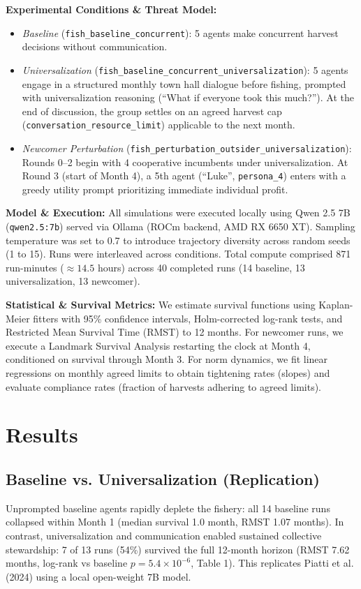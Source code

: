 ﻿\documentclass[11pt,a4paper]{article}
\begin{document}
\textbf{Experimental Conditions \& Threat Model:}
\begin{itemize}[leftmargin=*,itemsep=1pt]
    \item \textit{Baseline} (\texttt{fish\_baseline\_concurrent}): 5 agents make concurrent harvest decisions without communication.
    \item \textit{Universalization} (\texttt{fish\_baseline\_concurrent\_universalization}): 5 agents engage in a structured monthly town hall dialogue before fishing, prompted with universalization reasoning (``What if everyone took this much?''). At the end of discussion, the group settles on an agreed harvest cap (\texttt{conversation\_resource\_limit}) applicable to the next month.
    \item \textit{Newcomer Perturbation} (\texttt{fish\_perturbation\_outsider\_universalization}): Rounds 0--2 begin with 4 cooperative incumbents under universalization. At Round 3 (start of Month 4), a 5th agent (``Luke'', \texttt{persona\_4}) enters with a greedy utility prompt prioritizing immediate individual profit.
\end{itemize}

\textbf{Model \& Execution:} All simulations were executed locally using Qwen 2.5 7B (\texttt{qwen2.5:7b}) served via Ollama (ROCm backend, AMD RX 6650 XT). Sampling temperature was set to 0.7 to introduce trajectory diversity across random seeds (1 to 15). Runs were interleaved across conditions. Total compute comprised 871 run-minutes ($\approx 14.5$ hours) across 40 completed runs (14 baseline, 13 universalization, 13 newcomer).

\textbf{Statistical & Survival Metrics:} We estimate survival functions using Kaplan-Meier fitters with 95\% confidence intervals, Holm-corrected log-rank tests, and Restricted Mean Survival Time (RMST) to 12 months. For newcomer runs, we execute a Landmark Survival Analysis restarting the clock at Month 4, conditioned on survival through Month 3. For norm dynamics, we fit linear regressions on monthly agreed limits to obtain tightening rates (slopes) and evaluate compliance rates (fraction of harvests adhering to agreed limits).

\section{Results}

\subsection{Baseline vs. Universalization (Replication)}
Unprompted baseline agents rapidly deplete the fishery: all 14 baseline runs collapsed within Month 1 (median survival 1.0 month, RMST 1.07 months). In contrast, universalization and communication enabled sustained collective stewardship: 7 of 13 runs (54\%) survived the full 12-month horizon (RMST 7.62 months, log-rank vs baseline $p = 5.4 \times 10^{-6}$, Table 1). This replicates Piatti et al. (2024) using a local open-weight 7B model.
\end{document}
